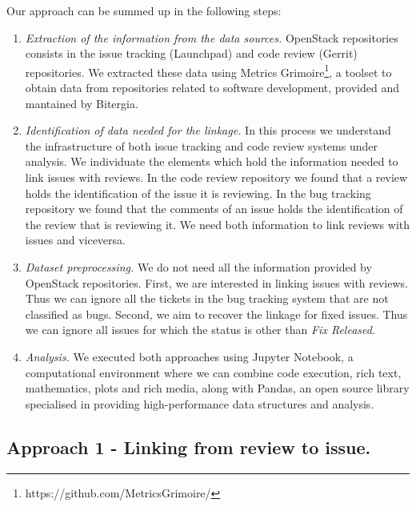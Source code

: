 \documentclass[conference,compsoc]{IEEEtran}
\begin{document}
Our approach can be summed up in the following steps:
\\
\begin{enumerate}
\item \emph{Extraction of the information from the data sources.}
OpenStack repositories consists in the
issue tracking (Launchpad) and code review (Gerrit) 
repositories. We extracted these
data using Metrics Grimoire\footnote{https://github.com/MetricsGrimoire/}, 
a toolset to obtain data from repositories related to software development, 
provided and mantained by Bitergia.
\item \emph{Identification of data needed for the linkage.} In this process we 
understand the infrastructure of both issue 
tracking and code review systems under analysis. 
We individuate the elements which hold the 
information needed to link issues with reviews. 
In the code review repository we found that a review 
holds the identification of the issue it is reviewing. 
In the bug tracking repository we found that the comments of an issue holds the 
identification of the review that is reviewing it. 
We need both information to link reviews with issues and viceversa.
\item \emph{Dataset preprocessing.} We do not need all the information 
provided by OpenStack repositories.
First, we are interested in linking issues with reviews. Thus we can ignore all 
the tickets in the bug tracking system that are not classified as bugs. 
Second, we aim to recover the linkage for fixed issues. Thus we can 
ignore all issues for which the status is other than \emph{Fix Released}.   
\item \emph{Analysis.} We executed both approaches using Jupyter Notebook, a computational 
environment where we can combine code execution, rich text, 
mathematics, plots and rich media, along with Pandas, an open source library 
specialised in providing high-performance data structures and analysis. 
\end{enumerate}

\subsection{Approach 1 - Linking from review to issue.}
\end{document}
